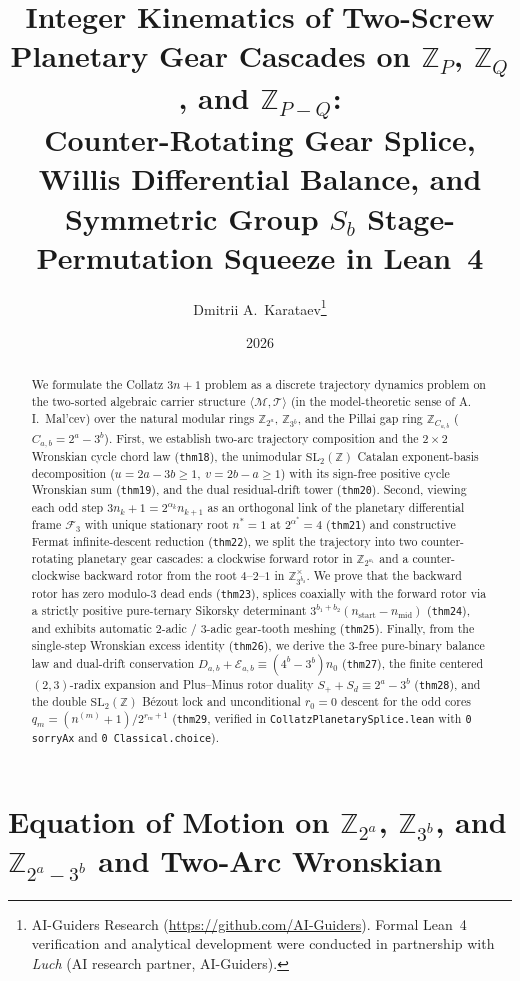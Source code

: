 \documentclass[11pt,a4paper]{article}
\title{\textbf{Integer Kinematics of Two-Screw Planetary Gear Cascades on $\mathbb{Z}_{P}$, $\mathbb{Z}_{Q}$, and $\mathbb{Z}_{P - Q}$:\\ Counter-Rotating Gear Splice, Willis Differential Balance, and Symmetric Group $S_b$ Stage-Permutation Squeeze in Lean~4}}
\author{Dmitrii A.~Karataev\thanks{AI-Guiders Research (\url{https://github.com/AI-Guiders}). Formal Lean~4 verification and analytical development were conducted in partnership with \emph{Luch} (AI research partner, AI-Guiders).}}
\date{2026}
\theoremstyle{definition}
\theoremstyle{remark}
\begin{document}
\maketitle

\begin{abstract}
We formulate the Collatz $3n+1$ problem as a discrete trajectory dynamics problem on the two-sorted algebraic carrier structure $\langle\mathcal{M},\mathcal{T}\rangle$ (in the model-theoretic sense of A.\,I.~Mal'cev) over the natural modular rings $\mathbb{Z}_{2^a}$, $\mathbb{Z}_{3^b}$, and the Pillai gap ring $\mathbb{Z}_{C_{a,b}}$ ($C_{a,b} = 2^a - 3^b$). First, we establish two-arc trajectory composition and the $2\times 2$ Wronskian cycle chord law (\texttt{thm18}), the unimodular $\mathrm{SL}_2(\mathbb{Z})$ Catalan exponent-basis decomposition ($u = 2a - 3b \ge 1,\ v = 2b - a \ge 1$) with its sign-free positive cycle Wronskian sum (\texttt{thm19}), and the dual residual-drift tower (\texttt{thm20}). Second, viewing each odd step $3 n_k + 1 = 2^{\alpha_k} n_{k+1}$ as an orthogonal link of the planetary differential frame $\mathcal{F}_3$ with unique stationary root $n^* = 1$ at $2^{\alpha^*} = 4$ (\texttt{thm21}) and constructive Fermat infinite-descent reduction (\texttt{thm22}), we split the trajectory into two counter-rotating planetary gear cascades: a clockwise forward rotor in $\mathbb{Z}_{2^{a_1}}$ and a counter-clockwise backward rotor from the root $4\text{--}2\text{--}1$ in $\mathbb{Z}_{3^{b_2}}^\times$. We prove that the backward rotor has zero modulo-$3$ dead ends (\texttt{thm23}), splices coaxially with the forward rotor via a strictly positive pure-ternary Sikorsky determinant $3^{b_1+b_2}(n_{\mathrm{start}} - n_{\mathrm{mid}})$ (\texttt{thm24}), and exhibits automatic $2$-adic / $3$-adic gear-tooth meshing (\texttt{thm25}). Finally, from the single-step Wronskian excess identity (\texttt{thm26}), we derive the $3$-free pure-binary balance law and dual-drift conservation $D_{a,b} + \mathcal{E}_{a,b} \equiv (4^b - 3^b) n_0$ (\texttt{thm27}), the finite centered $(2,3)$-radix expansion and Plus--Minus rotor duality $S_+ + S_d \equiv 2^a - 3^b$ (\texttt{thm28}), and the double $\mathrm{SL}_2(\mathbb{Z})$ Bézout lock and unconditional $r_0 = 0$ descent for the odd cores $q_m = (n^{(m)} + 1)/2^{r_m + 1}$ (\texttt{thm29}, verified in \texttt{CollatzPlanetarySplice.lean} with \texttt{0 sorryAx} and \texttt{0 Classical.choice}).
\end{abstract}

\section{Equation of Motion on $\mathbb{Z}_{2^a}$, $\mathbb{Z}_{3^b}$, and $\mathbb{Z}_{2^a - 3^b}$ and Two-Arc Wronskian}
\label{sec:two-arc-wronskian}
\end{document}
